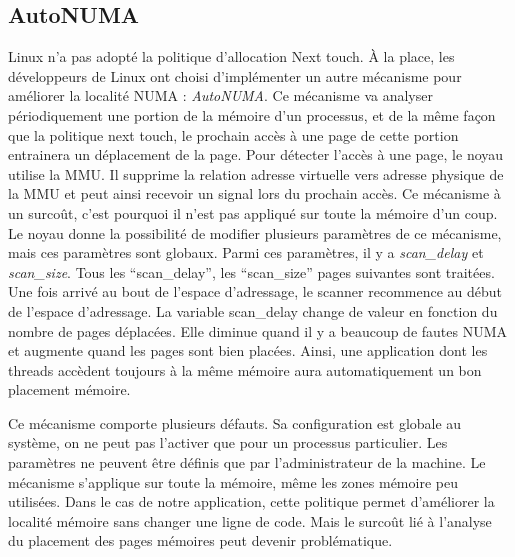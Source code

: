 \subsection{AutoNUMA}
\label{sec:autonuma}
Linux n'a pas adopté la politique d'allocation Next touch.
%
\`A la place, les développeurs de Linux ont choisi d'implémenter un autre mécanisme pour améliorer la localité NUMA : {\em AutoNUMA}.
%
Ce mécanisme va analyser périodiquement une portion de la mémoire d'un processus, et de la même façon que la politique next touch, le prochain accès à une page de cette portion entrainera un déplacement de la page.
%
Pour détecter l'accès à une page, le noyau utilise la MMU.
%
Il supprime la relation adresse virtuelle vers adresse physique de la MMU et peut ainsi recevoir un signal lors du prochain accès.
%
Ce mécanisme à un surcoût, c'est pourquoi il n'est pas appliqué sur toute la mémoire d'un coup.
%
Le noyau donne la possibilité de modifier plusieurs paramètres de ce mécanisme, mais ces paramètres sont globaux.
%
Parmi ces paramètres, il y a {\em scan\_delay} et {\em scan\_size}.
%
Tous les ``scan\_delay'', les ``scan\_size'' pages suivantes sont traitées.
%
Une fois arrivé au bout de l'espace d'adressage, le scanner recommence au début de l'espace d'adressage.
%
La variable scan\_delay change de valeur en fonction du nombre de pages déplacées.
%
Elle diminue quand il y a beaucoup de fautes NUMA et augmente quand les pages sont bien placées.
%
Ainsi, une application dont les threads accèdent toujours à la même mémoire aura automatiquement un bon placement mémoire.

Ce mécanisme comporte plusieurs défauts.
%
Sa configuration est globale au système, on ne peut pas l'activer que pour un processus particulier.
%
Les paramètres ne peuvent être définis que par l'administrateur de la machine.
%
Le mécanisme s'applique sur toute la mémoire, même les zones mémoire peu utilisées.
%
Dans le cas de notre application, cette politique permet d'améliorer la localité mémoire sans changer une ligne de code.
%
Mais le surcoût lié à l'analyse du placement des pages mémoires peut devenir problématique.
